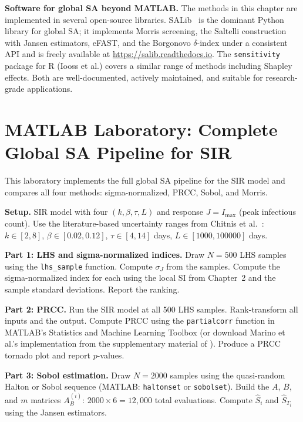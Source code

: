 \medskip\noindent
\textbf{Software for global SA beyond MATLAB.}
The methods in this chapter are implemented in several open-source
libraries.
SALib~\cite{herman2017salib} is the dominant Python library for global SA;
it implements Morris screening, the Saltelli construction with Jansen
estimators, eFAST, and the Borgonovo $\delta$-index under a consistent
API and is freely available at \url{https://salib.readthedocs.io}.
The \texttt{sensitivity} package for R (Iooss et al.) covers a similar
range of methods including Shapley effects.
Both are well-documented, actively maintained, and suitable for
research-grade applications.

\section{MATLAB Laboratory: Complete Global SA Pipeline for SIR}
\label{sec:ch9matlab}

This laboratory implements the full global SA pipeline for the SIR model
and compares all four methods: sigma-normalized, PRCC, Sobol, and Morris.

\textbf{Setup.}
SIR model with four \POIs $(k, \beta, \tau, L)$ and response $J = I_{\max}$
(peak infectious count). Use the literature-based uncertainty ranges
from Chitnis et al.~\cite{chitnis2008determining}:
$k \in [2, 8]$, $\beta \in [0.02, 0.12]$, $\tau \in [4, 14]$ days,
$L \in [1000, 100000]$ days.

\textbf{Part 1: LHS and sigma-normalized indices.}
Draw $N = 500$ LHS samples using the \texttt{lhs\_sample} function.
Compute $\sigma_{J}$ from the samples. Compute the sigma-normalized index
for each \POI using the local SI from Chapter~2 and the sample
standard deviations. Report the ranking.

\textbf{Part 2: PRCC.}
Run the SIR model at all 500 LHS samples. Rank-transform all inputs
and the output. Compute PRCC using the \texttt{partialcorr} function
in MATLAB's Statistics and Machine Learning Toolbox
(or download Marino et al.'s implementation from the supplementary
material of \cite{marino2008methodology}).
Produce a PRCC tornado plot and report $p$-values.

\textbf{Part 3: Sobol estimation.}
Draw $N = 2000$ samples using the quasi-random Halton or Sobol sequence
(MATLAB: \texttt{haltonset} or \texttt{sobolset}).
Build the $A$, $B$, and $m$ matrices $A_B^{(i)}$: $2000\times6 = 12{,}000$
total evaluations.
Compute $\hat{S}_i$ and $\hat{S}_{T_i}$ using the Jansen estimators.

